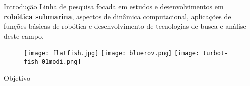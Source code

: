 
\begin{frame}[c]{Introdução}
    \transdissolve[duration=0.5]
    Linha de pesquisa focada em estudos e desenvolvimentos em \textbf{robótica submarina}, 
    aspectos de dinâmica computacional, aplicações de funções básicas de robótica e desenvolvimento de 
    tecnologias de busca e análise deste campo.
    \begin{figure}
        \texttt{[image: flatfish.jpg]}
        \texttt{[image: bluerov.png]}
        \texttt{[image: turbot-fish-01modi.png]}
    
    \end{figure}
   
    
\end{frame}
\begin{frame}[c]{Objetivo} 
    \transdissolve[duration=0.5]
   
    \begin{center}
    \end{center}
\end{frame}
